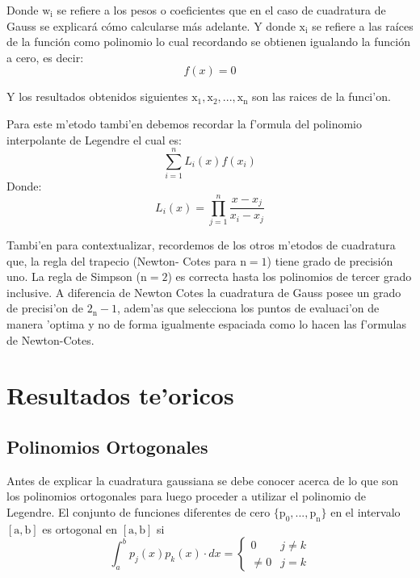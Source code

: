 \documentclass{article}
\begin{document}
			Donde $\mathrm{w_{i}}$ se refiere a los pesos o coeficientes que en el caso de cuadratura de Gauss se explicará cómo calcularse más adelante.
			Y donde $\mathrm{x_{i}}$ se refiere a las raíces de la función como polinomio lo cual recordando se obtienen igualando la función a cero, es decir:
			\begin{equation}\label{eq:eq2}
				f(x)=0
			\end{equation}
			
			Y los resultados obtenidos siguientes $\mathrm{x_{1}, x_{2},..., x_{n}}$ son las raices de la funci'on.
			
			Para este m'etodo tambi'en debemos recordar la f'ormula del polinomio interpolante de Legendre el cual es:
			\begin{equation}\label{eq:eq3}
				\sum_{i=1}^{n}L_{i}(x)f(x_{i})
			\end{equation} 
			Donde:
			\begin{equation}
				L_{i}(x)=\prod_{j=1}^{n}\frac{x - x_{j}}{x_{i} - x_{j}}
			\end{equation}
			
			Tambi'en para contextualizar, recordemos de los otros m'etodos de cuadratura que, la regla del trapecio (Newton- Cotes para $\mathrm{n=1}$) tiene grado de precisión uno. La regla de Simpson ($\mathrm{n=2}$) es correcta hasta los polinomios de tercer grado inclusive. A diferencia de Newton Cotes la cuadratura de Gauss posee un grado de precisi'on de $\mathrm{2_{n}-1}$, adem'as que selecciona los puntos de evaluaci'on de manera 'optima y no de forma igualmente espaciada como lo hacen las f'ormulas de Newton-Cotes.
				
			
		\section*{Resultados te'oricos}
			\subsection*{Polinomios Ortogonales}
				Antes de explicar la cuadratura gaussiana se debe conocer acerca de lo que son los polinomios ortogonales para luego proceder a utilizar el polinomio de Legendre.
				El conjunto de funciones diferentes de cero $\mathrm{\lbrace p_{0}, ..., p_{n}\rbrace}$ en el intervalo $\mathrm{[a,b]}$ es ortogonal en $\mathrm{[a,b]}$ si
				\begin{equation}
					\int_{a}^{b}p_{j}(x)p_{k}(x)\cdot dx = \left\{\begin{array}{lcc}
						0 & j\ne k\\
						\ne 0 & j=k
					\end{array}
					\right.	
				\end{equation}
				
\end{document}
